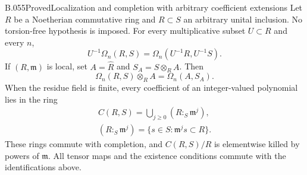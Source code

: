 \begin{saresult}{B.055}{Proved}{Localization and completion with arbitrary coefficient extensions}
Let $R$ be a Noetherian commutative ring and $R\subset S$
an arbitrary unital inclusion. No torsion-free hypothesis is imposed.
For every multiplicative subset $U\subset R$ and every $n$,
\[
 U^{-1}\Omega_n(R,S)
       =\Omega_n(U^{-1}R,U^{-1}S).                         \tag{B55.1}
\]
If $(R,\mathfrak m)$ is local, set $A=\widehat R$ and
$S_A=S\otimes_R A$. Then
\[
 \Omega_n(R,S)\otimes_R A=\Omega_n(A,S_A).                \tag{B55.2}
\]
When the residue field is finite, every coefficient of an
integer-valued polynomial lies in the ring
\[
\begin{gathered}
 C(R,S)=\bigcup_{j\ge0}(R:_S\mathfrak m^j),\\
 (R:_S\mathfrak m^j)=\{s\in S:\mathfrak m^js\subset R\}.
\end{gathered}
                                                               \tag{B55.3}
\]
These rings commute with completion, and $C(R,S)/R$ is
elementwise killed by powers of $\mathfrak m$.
All tensor maps and the existence conditions commute with
the identifications above.
\end{saresult}
